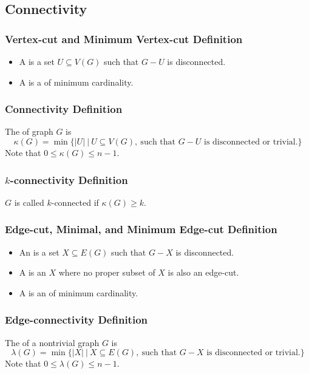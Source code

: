 \subsection{Connectivity}

\subsubsection*{Vertex-cut and Minimum Vertex-cut Definition}
\begin{itemize}
    \item A  is a set $U \subseteq V(G)$ such that $G-U$ is disconnected.
    \item A  is a  of minimum cardinality.
\end{itemize}

\subsubsection*{Connectivity Definition}
The  of graph $G$ is
\[
    \kappa(G) = \min\{|U|~\vert~U \subseteq V(G),~\text{such that $G-U$ is disconnected or trivial.}\}
\]
Note that $0 \leq \kappa(G) \leq n-1$.

\subsubsection*{$k$-connectivity Definition}
$G$ is called $k$-connected if $\kappa(G) \geq k$.

\subsubsection*{Edge-cut, Minimal, and Minimum Edge-cut Definition}
\begin{itemize}
    \item An  is a set $X \subseteq E(G)$ such that $G-X$ is disconnected.
    \item A  is an  $X$ where no proper subset of $X$ is also an edge-cut.
    \item A  is an  of minimum cardinality.
\end{itemize}

\subsubsection*{Edge-connectivity Definition}
The  of a nontrivial graph $G$ is
\[
    \lambda(G) = \min\{|X|~\vert~X \subseteq E(G),~\text{such that $G-X$ is disconnected or trivial.}\}
\]
Note that $0 \leq \lambda(G) \leq n-1$.

